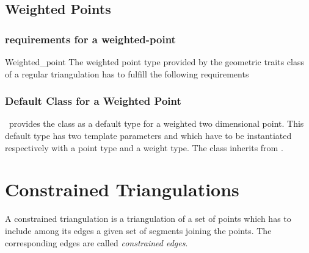 \subsection{Weighted Points}

\subsubsection{requirements for a weighted-point}
\begin{ccClass}{Weighted_point}
The weighted point type  provided by the geometric traits class
of a regular triangulation has to fulfill
the following requirements

\ccThreeToTwo
\ccTypes
{}
\ccGlue
{}
\ccGlue
{}

\ccCreation
{}
\ccGlue
{}

\ccAccessFunctions
{}
\ccGlue
{}

\ccOperations
{}
\end{ccClass}


\subsubsection{Default Class for a Weighted Point}
\cgal\ provides the class 
as a default type for a  weighted two dimensional point.
This default type has two template parameters 
and   which have to be instantiated respectively 
with a point type and a weight type.
The class 
 inherits from .




\section{Constrained Triangulations}
\label{I1_Sect_Constrained}



A constrained triangulation is a triangulation of a set of points
which has to include among its edges 
a given set of segments joining the points. The corresponding 
edges are called {\em constrained edges}. 

